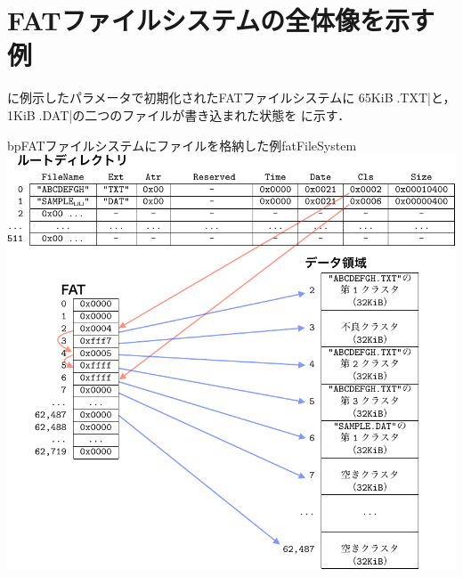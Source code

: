 

\section{FATファイルシステムの全体像を示す例}
に例示したパラメータで初期化されたFATファイルシステムに
65KiBの\|\ABCDEFGH.TXT|と，
1KiBの\|\SAMPLE.DAT|の二つのファイルが書き込まれた状態を
に示す．

\begin{myfig}{bp}{FATファイルシステムにファイルを格納した例}{fatFileSystem}
  \includegraphics[scale=1.0]{Fig/fatFileSystem-crop.pdf}
\end{myfig}

